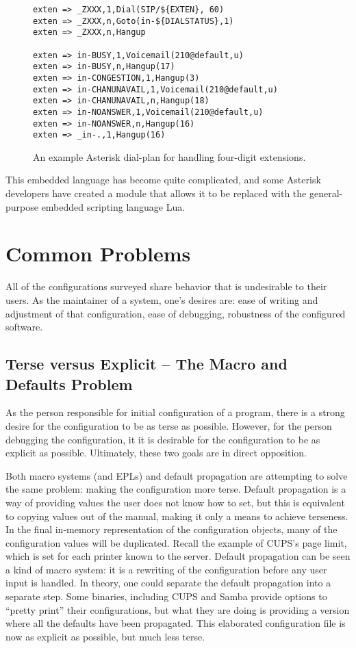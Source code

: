 \documentclass[letterpaper,twocolumn,10pt]{article}
\begin{document}
\begin{figure}
\caption{\label{fig:ast}An example Asterisk dial-plan for handling four-digit extensions.}
\scriptsize
\begin{verbatim}
exten => _ZXXX,1,Dial(SIP/${EXTEN}, 60)
exten => _ZXXX,n,Goto(in-${DIALSTATUS},1)
exten => _ZXXX,n,Hangup

exten => in-BUSY,1,Voicemail(210@default,u)
exten => in-BUSY,n,Hangup(17)
exten => in-CONGESTION,1,Hangup(3)
exten => in-CHANUNAVAIL,1,Voicemail(210@default,u)
exten => in-CHANUNAVAIL,n,Hangup(18)
exten => in-NOANSWER,1,Voicemail(210@default,u)
exten => in-NOANSWER,n,Hangup(16)
exten => _in-.,1,Hangup(16)
\end{verbatim}
\end{figure}

This embedded language has become quite complicated, and some Asterisk developers have created a module that allows it to be replaced with the general-purpose embedded scripting language Lua.

\section{Common Problems}
All of the configurations surveyed share behavior that is undesirable to their users. As the maintainer of a system, one's desires are: ease of writing and adjustment of that configuration, ease of debugging, robustness of the configured software.

\subsection{Terse versus Explicit -- The Macro and Defaults Problem}
As the person responsible for initial configuration of a program, there is a strong desire for the configuration to be as terse as possible. However, for the person debugging the configuration, it it is desirable for the configuration to be as explicit as possible. Ultimately, these two goals are in direct opposition.

Both macro systems (and EPLs) and default propagation are attempting to solve the same problem: making the configuration more terse. Default propagation is a way of providing values the user does not know how to set, but this is equivalent to copying values out of the manual, making it only a means to achieve terseness. In the final in-memory representation of the configuration objects, many of the configuration values will be duplicated. Recall the example of CUPS's page limit, which is set for each printer known to the server. Default propagation can be seen a kind of macro system: it is a rewriting of the configuration before any user input is handled. In theory, one could separate the default propagation into a separate step. Some binaries, including CUPS and Samba provide options to ``pretty print'' their configurations, but what they are doing is providing a version where all the defaults have been propagated. This elaborated configuration file is now as explicit as possible, but much less terse.
\end{document}

